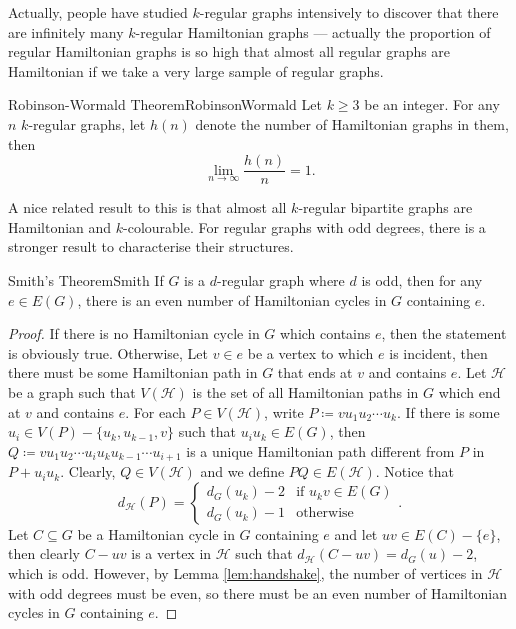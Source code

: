\documentclass[math, code]{amznotes}
\theoremstyle{remark}
\begin{document}
Actually, people have studied $k$-regular graphs intensively to discover that there are infinitely many $k$-regular Hamiltonian graphs --- actually the proportion of regular Hamiltonian graphs is so high that almost all regular graphs are Hamiltonian if we take a very large sample of regular graphs.
\begin{thmbox}{Robinson-Wormald Theorem}{RobinsonWormald}
    Let $k \geq 3$ be an integer. For any $n$ $k$-regular graphs, let $h(n)$ denote the number of Hamiltonian graphs in them, then 
    \begin{equation*}
        \lim_{n \to \infty}\frac{h(n)}{n} = 1.
    \end{equation*}
\end{thmbox}
A nice related result to this is that almost all $k$-regular bipartite graphs are Hamiltonian and $k$-colourable. For regular graphs with odd degrees, there is a stronger result to characterise their structures.
\begin{thmbox}{Smith's Theorem}{Smith}
    If $G$ is a $d$-regular graph where $d$ is odd, then for any $e \in E(G)$, there is an even number of Hamiltonian cycles in $G$ containing $e$.
    \tcblower
    \begin{proof}
        If there is no Hamiltonian cycle in $G$ which contains $e$, then the statement is obviously true. Otherwise, Let $v \in e$ be a vertex to which $e$ is incident, then there must be some Hamiltonian path in $G$ that ends at $v$ and contains $e$. Let $\mathcal{H}$ be a graph such that $V(\mathcal{H})$ is the set of all Hamiltonian paths in $G$ which end at $v$ and contains $e$. For each $P \in V(\mathcal{H})$, write $P \coloneqq vu_1u_2\cdots u_k$. If there is some $u_i \in V(P) - \{u_k, u_{k - 1}, v\}$ such that $u_iu_k \in E(G)$, then $Q \coloneqq vu_1u_2\cdots u_iu_ku_{k - 1}\cdots u_{i + 1}$ is a unique Hamiltonian path different from $P$ in $P + u_iu_k$. Clearly, $Q \in V(\mathcal{H})$ and we define $PQ \in E(\mathcal{H})$. Notice that 
        \begin{equation*}
            d_{\mathcal{H}}(P) = \begin{cases}
                d_G(u_k) - 2 & \textrm{if } u_kv \in E(G) \\
                d_G(u_k) - 1 & \textrm{otherwise}
            \end{cases}.
        \end{equation*}
        Let $C \subseteq G$ be a Hamiltonian cycle in $G$ containing $e$ and let $uv \in E(C) - \{e\}$, then clearly $C - uv$ is a vertex in $\mathcal{H}$ such that $d_{\mathcal{H}}(C - uv) = d_G(u) - 2$, which is odd. However, by Lemma \ref{lem:handshake}, the number of vertices in $\mathcal{H}$ with odd degrees must be even, so there must be an even number of Hamiltonian cycles in $G$ containing $e$.
    \end{proof}
\end{thmbox}
\end{document}
